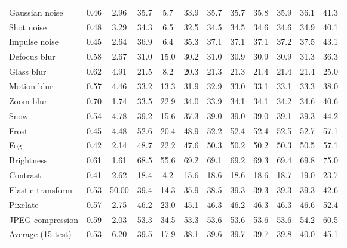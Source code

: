 \begin{table}[t]
\begin{tabular}{l|cc|cc|cc|ccccc}
        \midrule
        Gaussian noise & 0.46 & 2.96 & 35.7 & 5.7 & 33.9 & 35.7 & 35.7 & 35.8 & 35.9 & 36.1 & 41.3 \\
        Shot noise & 0.48 & 3.29 & 34.3 & 6.5 & 32.5 & 34.5 & 34.5 & 34.6 & 34.6 & 34.9 & 40.1 \\
        Impulse noise & 0.45 & 2.64 & 36.9 & 6.4 & 35.3 & 37.1 & 37.1 & 37.1 & 37.2 & 37.5 & 43.1 \\
        Defocus blur & 0.58 & 2.67 & 31.0 & 15.0 & 30.2 & 31.0 & 30.9 & 30.9 & 30.9 & 31.3 & 36.3 \\
        Glass blur & 0.62 & 4.91 & 21.5 & 8.2 & 20.3 & 21.3 & 21.3 & 21.4 & 21.4 & 21.4 & 25.0 \\
        Motion blur & 0.57 & 4.46 & 33.2 & 13.3 & 31.9 & 32.9 & 33.0 & 33.1 & 33.1 & 33.3 & 38.0 \\
        Zoom blur & 0.70 & 1.74 & 33.5 & 22.9 & 34.0 & 33.9 & 34.1 & 34.1 & 34.2 & 34.6 & 40.6 \\
        Snow & 0.54 & 4.78 & 39.2 & 15.6 & 37.3 & 39.0 & 39.0 & 39.0 & 39.1 & 39.3 & 44.2 \\
        Frost & 0.45 & 4.48 & 52.6 & 20.4 & 48.9 & 52.2 & 52.4 & 52.4 & 52.5 & 52.7 & 57.1 \\
        Fog & 0.42 & 2.14 & 48.7 & 22.2 & 47.6 & 50.3 & 50.2 & 50.2 & 50.3 & 50.5 & 57.1 \\
        Brightness & 0.61 & 1.61 & 68.5 & 55.6 & 69.2 & 69.1 & 69.2 & 69.3 & 69.4 & 69.8 & 75.0 \\
        Contrast & 0.41 & 2.62 & 18.4 & 4.2 & 15.6 & 18.6 & 18.6 & 18.6 & 18.7 & 19.0 & 23.7 \\
        Elastic transform & 0.53 & 50.00 & 39.4 & 14.3 & 35.9 & 38.5 & 39.3 & 39.3 & 39.3 & 39.3 & 42.6 \\
        Pixelate & 0.57 & 2.75 & 46.2 & 23.0 & 45.1 & 46.3 & 46.2 & 46.3 & 46.3 & 46.6 & 52.4 \\
        JPEG compression & 0.59 & 2.03 & 53.3 & 34.5 & 53.3 & 53.6 & 53.6 & 53.6 & 53.6 & 54.2 & 60.5 \\
        \midrule
        Average (15 test) & 0.53 & 6.20 & 39.5 & 17.9 & 38.1 & 39.6 & 39.7 & 39.7 & 39.8 & 40.0 & 45.1 \\
        \bottomrule
    \end{tabular}
\end{table}
